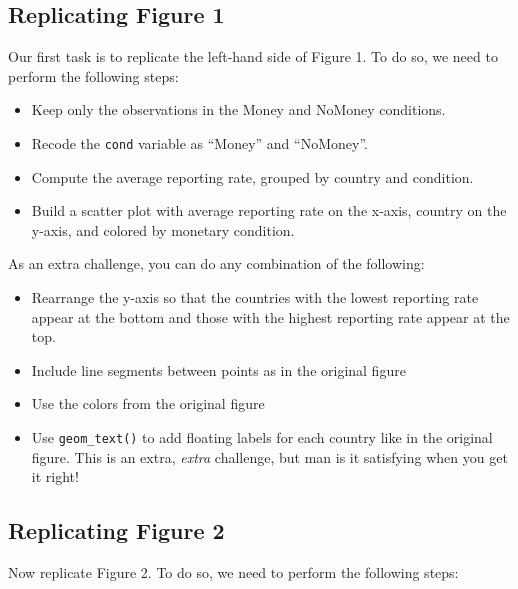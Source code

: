 \documentclass[12pt,halfline,a4paper,]{ouparticle}
\providecommand{\tightlist}{%
  \setlength{\itemsep}{0pt}\setlength{\parskip}{0pt}}
\begin{document}
\hypertarget{replicating-figure-1}{%
\subsection{Replicating Figure 1}\label{replicating-figure-1}}

Our first task is to replicate the left-hand side of Figure 1. To do so,
we need to perform the following steps:

\begin{itemize}
\tightlist
\item
  Keep only the observations in the Money and NoMoney conditions.
\item
  Recode the \texttt{cond} variable as ``Money'' and ``NoMoney''.
\item
  Compute the average reporting rate, grouped by country and condition.
\item
  Build a scatter plot with average reporting rate on the x-axis,
  country on the y-axis, and colored by monetary condition.
\end{itemize}

\noindent As an extra challenge, you can do any combination of the
following:

\begin{itemize}
\tightlist
\item
  Rearrange the y-axis so that the countries with the lowest reporting
  rate appear at the bottom and those with the highest reporting rate
  appear at the top.
\item
  Include line segments between points as in the original figure
\item
  Use the colors from the original figure
\item
  Use \texttt{geom\_text()} to add floating labels for each country like
  in the original figure. This is an extra, \emph{extra} challenge, but
  man is it satisfying when you get it right!
\end{itemize}

\hypertarget{replicating-figure-2}{%
\subsection{Replicating Figure 2}\label{replicating-figure-2}}

Now replicate Figure 2. To do so, we need to perform the following
steps:
\end{document}
